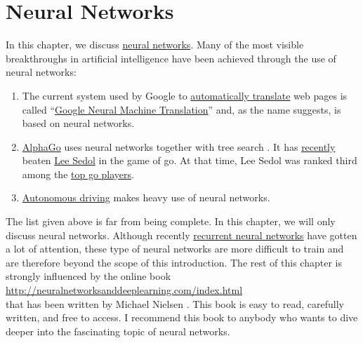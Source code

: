 \chapter{Neural Networks}
In this chapter, we discuss \href{https://en.wikipedia.org/wiki/Artificial_neural_network}{neural networks}.
Many of the most visible breakthroughs in artificial intelligence have been achieved through the use of neural
networks: 
\begin{enumerate}
\item The current system used by Google to \href{https://translate.google.com}{automatically translate} web
      pages is called 
      ``\href{https://en.wikipedia.org/wiki/Google_Neural_Machine_Translation}{Google Neural Machine
        Translation}''
      and,  as the name suggests, is based on neural networks.  
\item \href{https://de.wikipedia.org/wiki/AlphaGo}{AlphaGo} uses neural networks together with tree search
      \cite{silver:2016}.  It has \href{https://en.wikipedia.org/wiki/AlphaGo_versus_Lee_Sedol}{recently} 
      beaten \href{https://en.wikipedia.org/wiki/Lee_Sedol}{Lee Sedol} in the game of go.  At that time, Lee Sedol was
      ranked third among the \href{https://www.goratings.org/history/}{top go players}. 
\item \href{https://en.wikipedia.org/wiki/Autonomous_car}{Autonomous driving} makes heavy use of neural networks.
\end{enumerate}
The list given above is far from being complete.  In this chapter, we will only discuss  
neural networks.  Although recently 
\href{https://en.wikipedia.org/wiki/Recurrent_neural_network}{recurrent neural networks} have gotten a lot of
attention, these type of neural networks are more difficult to train and are therefore beyond the scope of this
introduction.  The rest of this chapter is strongly influenced by the online book 
\\[0.2cm]
\hspace*{1.3cm}
\href{http://neuralnetworksanddeeplearning.com/index.html}{http://neuralnetworksanddeeplearning.com/index.html}
\\[0.2cm]
that has been written by Michael Nielsen \cite{nielsen:2015}.  This book is easy to read, carefully written, and
free to access.  I recommend this book to anybody who wants to dive deeper into the fascinating topic of neural
networks.

